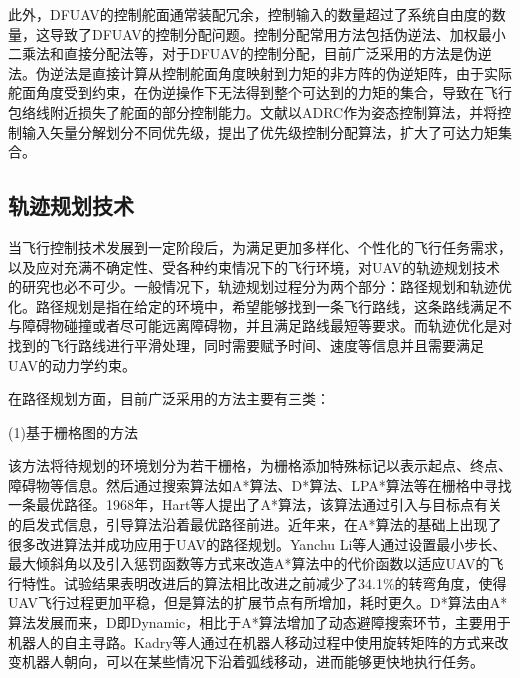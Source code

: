 此外，DFUAV的控制舵面通常装配冗余，控制输入的数量超过了系统自由度的数量，这导致了DFUAV的控制分配问题\cite{naldiPrototypeDuctedFanAerial2014b}。控制分配常用方法包括伪逆法、加权最小二乘法和直接分配法等，对于DFUAV的控制分配，目前广泛采用的方法是伪逆法\cite{peddlePracticalHoverFlight2009a,pflimlinPositionControlDucted2007b,shengNearHoverAdaptiveAttitude2015b}。伪逆法是直接计算从控制舵面角度映射到力矩的非方阵的伪逆矩阵，由于实际舵面角度受到约束，在伪逆操作下无法得到整个可达到的力矩的集合\cite{durhamAircraftControlAllocation2017a}，导致在飞行包络线附近损失了舵面的部分控制能力\cite{HKXB202010026}。文献\parencite{HKXB202010026}以ADRC作为姿态控制算法，并将控制输入矢量分解划分不同优先级，提出了优先级控制分配算法，扩大了可达力矩集合。

\subsection{轨迹规划技术}

当飞行控制技术发展到一定阶段后，为满足更加多样化、个性化的飞行任务需求，以及应对充满不确定性、受各种约束情况下的飞行环境，对UAV的轨迹规划技术的研究也必不可少。一般情况下，轨迹规划过程分为两个部分：路径规划和轨迹优化\cite{智能驾驶汽车规划控制算法及仿真应用}。路径规划是指在给定的环境中，希望能够找到一条飞行路线，这条路线满足不与障碍物碰撞或者尽可能远离障碍物，并且满足路线最短等要求。而轨迹优化是对找到的飞行路线进行平滑处理，同时需要赋予时间、速度等信息并且需要满足UAV的动力学约束。

在路径规划方面，目前广泛采用的方法主要有三类：

(1)基于栅格图的方法

    该方法将待规划的环境划分为若干栅格，为栅格添加特殊标记以表示起点、终点、障碍物等信息。然后通过搜索算法如A*算法、D*算法、LPA*算法等在栅格中寻找一条最优路径。1968年，Hart等人提出了A*算法\cite{hartFormalBasisHeuristic1968}，该算法通过引入与目标点有关的启发式信息，引导算法沿着最优路径前进。近年来，在A*算法的基础上出现了很多改进算法并成功应用于UAV的路径规划。Yanchu Li等人通过设置最小步长、最大倾斜角以及引入惩罚函数等方式来改造A*算法中的代价函数以适应UAV的飞行特性。试验结果表明改进后的算法相比改进之前减少了34.1\%的转弯角度，使得UAV飞行过程更加平稳，但是算法的扩展节点有所增加，耗时更久\cite{liImprovedASTARAlgorithm2024}。D*算法由A*算法发展而来，D即Dynamic，相比于A*算法增加了动态避障搜索环节，主要用于机器人的自主寻路。Kadry等人通过在机器人移动过程中使用旋转矩阵的方式来改变机器人朝向，可以在某些情况下沿着弧线移动，进而能够更快地执行任务\cite{kadryPathOptimizationDstar2022}。

